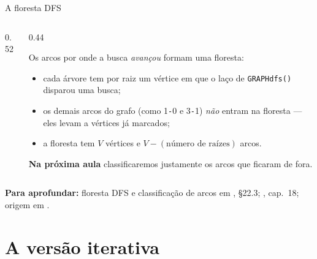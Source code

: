 \documentclass[aspectratio=169]{beamer}
\newcommand{\fonte}[1]{%
  \vfill
  {\tiny\color{gray!55!black}\textbf{Para aprofundar:} #1\par}%
}
\begin{document}
\begin{frame}{A floresta DFS}
  \begin{columns}[T]
    \begin{column}{0.52\textwidth}
      \begin{center}
      \end{center}
    \end{column}
    \begin{column}{0.44\textwidth}
      {\small
      Os arcos por onde a busca \emph{avançou} formam uma floresta:
      \begin{itemize}\scriptsize
        \item cada árvore tem por raiz um vértice em que o laço de
              \texttt{GRAPHdfs()} disparou uma busca;
        \item os demais arcos do grafo (como 1\texttt{-}0 e 3\texttt{-}1)
              \emph{não} entram na floresta --- eles levam a vértices já marcados;
        \item a floresta tem $V$ vértices e $V - (\text{número de raízes})$ arcos.
      \end{itemize}
      \textbf{Na próxima aula} classificaremos justamente os arcos que ficaram
      de fora.}
    \end{column}
  \end{columns}
  \fonte{floresta DFS e classificação de arcos em
  \cite{cormen2009introduction}, §22.3; \cite{sedgewick2002algorithms},
  cap.~18; origem em \cite{tarjan1972depth}.}
\end{frame}

\section{A versão iterativa}
\end{document}
